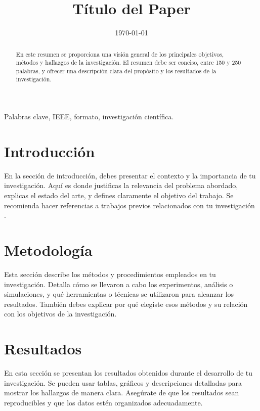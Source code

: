 \documentclass[conference, a4paper]{IEEEtran}
\begin{document}
\title{Título del Paper}
\author{
}
\date{\today}

\maketitle

\begin{abstract}
En este resumen se proporciona una visión general de los principales objetivos, métodos y hallazgos de la investigación. El resumen debe ser conciso, entre 150 y 250 palabras, y ofrecer una descripción clara del propósito y los resultados de la investigación.
\end{abstract}

\begin{IEEEkeywords}
Palabras clave, IEEE, formato, investigación científica.
\end{IEEEkeywords}

\section{Introducción}
En la sección de introducción, debes presentar el contexto y la importancia de tu investigación. Aquí es donde justificas la relevancia del problema abordado, explicas el estado del arte, y defines claramente el objetivo del trabajo. Se recomienda hacer referencias a trabajos previos relacionados con tu investigación \cite{referencia1}.

\section{Metodología}
Esta sección describe los métodos y procedimientos empleados en tu investigación. Detalla cómo se llevaron a cabo los experimentos, análisis o simulaciones, y qué herramientas o técnicas se utilizaron para alcanzar los resultados. También debes explicar por qué elegiste esos métodos y su relación con los objetivos de la investigación.

\section{Resultados}
En esta sección se presentan los resultados obtenidos durante el desarrollo de tu investigación. Se pueden usar tablas, gráficos y descripciones detalladas para mostrar los hallazgos de manera clara. Asegúrate de que los resultados sean reproducibles y que los datos estén organizados adecuadamente.
\end{document}
